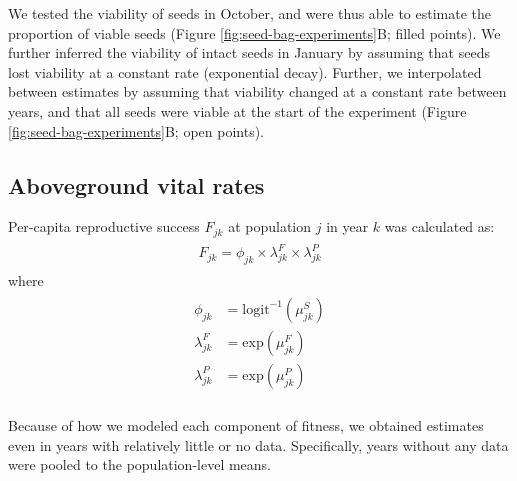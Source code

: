 \documentclass[12pt, oneside, titlepage]{article}   	%
\begin{document}
We tested the viability of seeds in October, and were thus able to estimate the proportion of viable seeds (Figure \ref{fig:seed-bag-experiments}B; filled points). We further inferred the viability of intact seeds in January by assuming that seeds lost viability at a constant rate (exponential decay). Further, we interpolated between estimates by assuming that viability changed at a constant rate between years, and that all seeds were viable at the start of the experiment (Figure \ref{fig:seed-bag-experiments}B; open points).

\subsection{Aboveground vital rates}




Per-capita reproductive success $F_{jk}$ at population $j$ in year $k$ was calculated as:
%
\begin{align}
  \begin{split}
F_{jk} = \phi_{jk} \times \lambda^F_{jk} \times \lambda^P_{jk} \label{eq:percapitars}
  \end{split}
\end{align}
%
where
%
\begin{align}
  \begin{split}
\phi_{jk} & = \mathrm{logit}^{-1}(\mu^S_{jk}) \\
\lambda^F_{jk} & = \mathrm{exp}(\mu^F_{jk}) \\
\lambda^P_{jk} & = \mathrm{exp}(\mu^P_{jk}) \\
  \end{split}
\end{align}

Because of how we modeled each component of fitness, we obtained estimates even in years with relatively little or no data. Specifically, years without any data were pooled to the population-level means. 

\clearpage
\newpage
\end{document}
